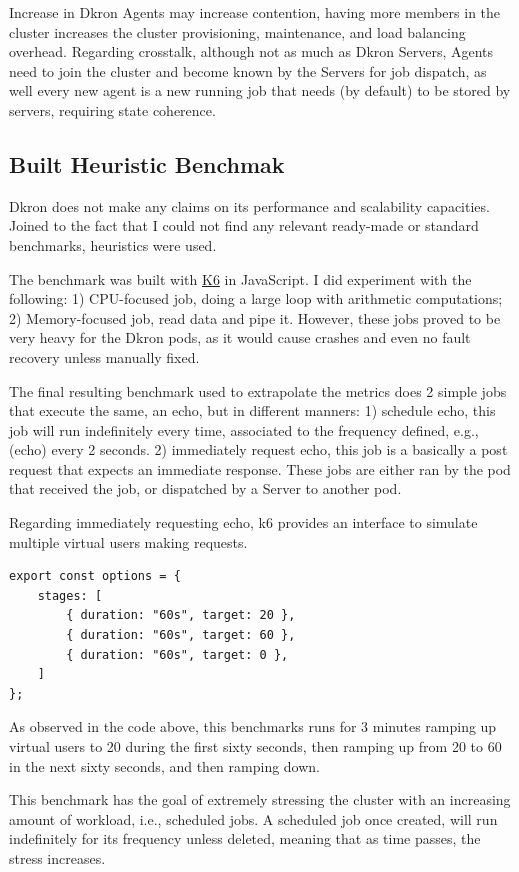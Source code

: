 \documentclass[runningheads]{llncs}
\begin{document}
Increase in Dkron Agents may increase contention, having more members in the cluster increases the cluster provisioning, maintenance,
and load balancing overhead. Regarding crosstalk, although not as much as Dkron Servers, Agents need to join the cluster and become
known by the Servers for job dispatch, as well every new agent is a new running job that needs (by default)
to be stored by servers, requiring state coherence.

\subsection{Built Heuristic Benchmak}

Dkron does not make any claims on its performance and scalability capacities. Joined to the fact that
I could not find any relevant ready-made or standard benchmarks, heuristics were used.

The benchmark was built with \href{https://k6.io/docs/}{K6} in JavaScript. I did experiment with
the following: 1) CPU-focused job, doing a large loop with arithmetic computations;
2) Memory-focused job, read data and pipe it.
However, these jobs proved to be very heavy for the Dkron pods, as it would cause crashes and even no
fault recovery unless manually fixed.

The final resulting benchmark used to extrapolate the metrics does 2 simple jobs
that execute the same, an echo, but in different manners: 1) schedule echo, this job will run indefinitely every time, associated to
the frequency defined, e.g., (echo) every 2 seconds.
2) immediately request echo, this job is a basically a post request that expects an immediate
response.
These jobs are either ran by the pod that received the job, or dispatched by a Server to another pod.

Regarding immediately requesting echo, k6 provides an interface to simulate multiple virtual users
making requests.

\begin{verbatim}
export const options = {
    stages: [
        { duration: "60s", target: 20 },
        { duration: "60s", target: 60 },
        { duration: "60s", target: 0 },
    ]
};
\end{verbatim}

As observed in the code above, this benchmarks runs for 3 minutes ramping up virtual
users to 20 during the first sixty seconds, then ramping up from 20 to 60 in the next sixty seconds,
and then ramping down.

This benchmark has the goal of extremely stressing the cluster with an increasing amount of
workload, i.e., scheduled jobs. A scheduled job once created, will run indefinitely for its frequency
unless deleted, meaning that as time passes, the stress increases.
\end{document}
